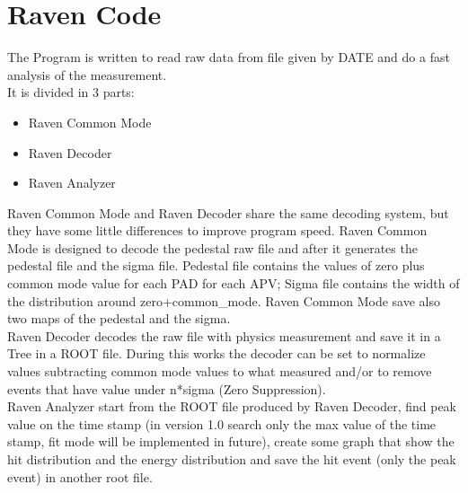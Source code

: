 \documentclass[a4paper,12pt]{article}
\begin{document}
	\section{Raven Code}
		The Program is written to read raw data from file given by DATE and do a fast analysis of the measurement.\\
		It is divided in 3 parts:
		\begin{itemize}
			\item Raven Common Mode
			\item Raven Decoder
			\item Raven Analyzer
		\end{itemize}
		Raven Common Mode and Raven Decoder share the same decoding system, but they have some little differences to improve program speed.
		Raven Common Mode is designed to decode the pedestal raw file and after it generates the pedestal file and the sigma file.
		Pedestal file contains the values of zero plus common mode value for each PAD for each APV; Sigma file contains the width of the distribution around zero+common\_mode.
		Raven Common Mode save also two maps of the pedestal and the sigma. \\
		Raven Decoder decodes the raw file with physics measurement and save it in a Tree in a ROOT file. 
		During this works the decoder can be set to normalize values subtracting common mode values to what measured and/or to remove events that have value under n*sigma (Zero Suppression).\\
		Raven Analyzer start from the ROOT file produced by Raven Decoder, find peak value on the time stamp (in version 1.0 search only the max value of the time stamp, fit mode will be implemented in future), create some graph that show the hit distribution and the energy distribution and save the hit event (only the peak event) in another root file.
\end{document}
